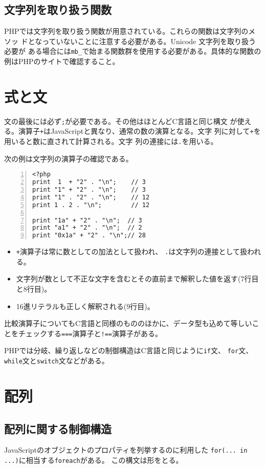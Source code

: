 \subsection{文字列を取り扱う関数}
PHPでは文字列を取り扱う関数が用意されている。これらの関数は文字列のメソッ
ドとなっていないことに注意する必要がある。Unicode 文字列を取り扱う必要が
ある場合には\Verb+mb_+で始まる関数群を使用する必要がある。具体的な関数の
例はPHPのサイトで確認すること。
\section{式と文}
文の最後には必ず\texttt{;}が必要である。その他はほとんどC言語と同じ構文
が使える。演算子\texttt{+}はJavaScriptと異なり、通常の数の演算となる。文字
列に対して\texttt{+}を用いると数に直されて計算される。文字
列の連接には\texttt{.}を用いる。
\begin{Exec}\upshape
次の例は文字列の演算子の確認である。
\begin{Verbatim}[numbers=left]
<?php
print  1  + "2" . "\n";    // 3
print "1" + "2" . "\n";    // 3
print "1" . "2" . "\n";    // 12
print 1 . 2 . "\n";        // 12

print "1a" + "2" . "\n";  // 3
print "a1" + "2" . "\n";  // 2
print "0x1a" + "2" . "\n";// 28
\end{Verbatim}
\begin{itemize}
 \item \texttt{+}演算子は常に数としての加法として扱われ、
 \texttt{.}は文字列の連接として扱われる。
 \item 文字列が数として不正な文字を含むとその直前まで解釈した値を返す(7行目と8行目)。
 \item 16進リテラルも正しく解釈される(9行目)。
\end{itemize}
\end{Exec}
比較演算子についてもC言語と同様のもののほかに、データ型も込めて等しいこ
とをチェックする\texttt{===}演算子と\texttt{!==}演算子がある。



PHPでは分岐、繰り返しなどの制御構造はC言語と同じように\texttt{if}文、
\texttt{for}文、\texttt{while}文と\texttt{switch}文などがある。

\section{配列}
\subsection{配列に関する制御構造}
JavaScriptのオブジェクトのプロパティを列挙するのに利用した
\texttt{for(... in ...)}に相当する\texttt{foreach}がある。
この構文は形をとる。

